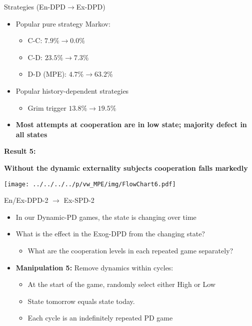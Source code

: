 \documentclass{beamer}
\begin{document}
\begin{frame}{Strategies (En-DPD$\rightarrow$Ex-DPD)}

\begin{itemize}
\item Popular pure strategy Markov:

\begin{itemize}
\item C-C: $7.9\%\rightarrow0.0\%$
\item C-D: $23.5\%\rightarrow7.3\%$
\item D-D (MPE): $4.7\%\rightarrow63.2\%$
\end{itemize}
\item Popular history-dependent strategies

\begin{itemize}
\item Grim trigger $13.8\%\rightarrow19.5\%$
\end{itemize}
\item \textbf{Most attempts at cooperation are in low state; majority defect
in all states}
\end{itemize}
\end{frame}

\begin{frame}


\textbf{Result 5: }



\textbf{Without the dynamic externality subjects cooperation falls
markedly}
\end{frame}

\begin{frame}


\begin{center}\texttt{[image: ../../../../p/vw\_MPE/img/FlowChart6.pdf]}
\end{center}
\end{frame}


\begin{frame}{En/Ex-DPD-2 $\rightarrow$ Ex-SPD-2}
\begin{itemize}
\item In our Dynamic-PD games, the state is changing over time
\item What is the effect in the Exog-DPD from the changing state?

\begin{itemize}
\item What are the cooperation levels in each repeated game separately?\pause
\end{itemize}
\item \textbf{Manipulation 5:} Remove dynamics within cycles:

\begin{itemize}
\item At the start of the game, randomly select either High or Low
\item State tomorrow equals state today.
\item Each cycle is an indefinitely repeated PD game
\end{itemize}
\end{itemize}
\end{frame}
\end{document}
